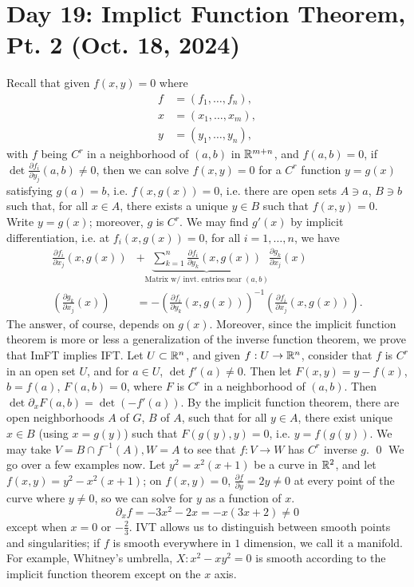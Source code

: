 \section{Day 19: Implict Function Theorem, Pt. 2 (Oct. 18, 2024)}
Recall that given $f(x, y) = 0$ where
\begin{align*}
    f &= (f_1, \dots, f_n), \\
    x &= (x_1, \dots, x_m), \\
    y &= (y_1, \dots, y_n),
\end{align*}
with $f$ being $C^r$ in a neighborhood of $(a, b)$ in $\mathbb R^{m + n}$, and $f(a, b) = 0$, if $\det \frac{\partial f_i}{\partial y_j} (a, b) \neq 0$, then we can solve $f(x, y) = 0$ for a $C^r$ function $y = g(x)$ satisfying $g(a) = b$, i.e. $f(x, g(x)) = 0$, i.e. there are open sets $A \ni a$, $B \ni b$ such that, for all $x \in A$, there exists a unique $y \in B$ such that $f(x, y) = 0$. Write $y = g(x)$; moreover, $g$ is $C^r$.
\medskip\newline
We may find $g'(x)$ by implicit differentiation, i.e. at $f_i(x, g(x)) = 0$, for all $i = 1, \dots, n$, we have
\begin{align*}
    \frac{\partial f_i}{\partial x_j} (x, g(x)) &+ \underbrace{\sum_{k=1}^n \frac{\partial f_i}{\partial y_k} (x, g(x))}_{\text{Matrix w/ invt. entries near }(a, b)} \frac{\partial g_k}{\partial x_j}(x) \\
    \left(\frac{\partial g_k}{\partial x_j}(x)\right) &= -\left(\frac{\partial f_i}{\partial y_k}(x, g(x))\right)^{-1} \left(\frac{\partial f_i}{\partial x_j}(x, g(x))\right).
\end{align*}
The answer, of course, depends on $g(x)$. Moreover, since the implicit function theorem is more or less a generalization of the inverse function theorem, we prove that ImFT implies IFT. Let $U \subset \mathbb R^n$, and given $f : U \to \mathbb R^n$, consider that $f$ is $C^r$ in an open set $U$, and for $a \in U$, $\det f'(a) \neq 0$. Then let $F(x, y) = y - f(x)$, $b = f(a)$, $F(a, b) = 0$, where $F$ is $C^r$ in a neighborhood of $(a, b)$. Then $\det \partial_x F (a, b) = \det (- f'(a))$. By the implicit function theorem, there are open neighborhoods $A$ of $G$, $B$ of $A$, such that for all $y \in A$, there exist unique $x \in B$ (using $x = g(y)$) such that $F(g(y), y) = 0$, i.e. $y = f(g(y))$. We may take $V = B \cap f^{-1}(A), W = A$ to see that $f : V \to W$ has $C^r$ inverse $g$. \qed
\medskip\newline
We go over a few examples now. Let $y^2 = x^2(x + 1)$ be a curve in $\mathbb R^2$, and let $f(x, y) = y^2 - x^2(x+1)$; on $f(x, y) = 0$, $\frac{\partial f}{\partial y} = 2y \neq 0$ at every point of the curve where $y \neq 0$, so we can solve for $y$ as a function of $x$.
\[ \partial_x f = -3x^2 - 2x = -x(3x + 2) \neq 0 \]
except when $x = 0$ or $-\frac{2}{3}$. IVT allows us to distinguish between smooth points and singularities; if $f$ is smooth everywhere in $1$ dimension, we call it a manifold. For example, Whitney's umbrella, $X : x^2 - xy^2 = 0$ is smooth according to the implicit function theorem except on the $x$ axis.